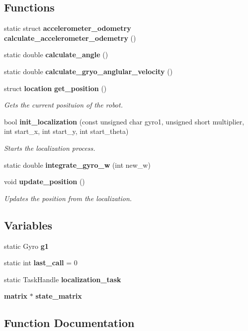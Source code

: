 \subsection*{Functions}
\begin{DoxyCompactItemize}
\item 
static struct \textbf{ accelerometer\+\_\+odometry} \textbf{ calculate\+\_\+accelerometer\+\_\+odemetry} ()
\item 
static double \textbf{ calculate\+\_\+angle} ()
\item 
static double \textbf{ calculate\+\_\+gryo\+\_\+anglular\+\_\+velocity} ()
\item 
struct \textbf{ location} \textbf{ get\+\_\+position} ()
\begin{DoxyCompactList}\small\item\em Gets the current posituion of the robot. \end{DoxyCompactList}\item 
bool \textbf{ init\+\_\+localization} (const unsigned char gyro1, unsigned short multiplier, int start\+\_\+x, int start\+\_\+y, int start\+\_\+theta)
\begin{DoxyCompactList}\small\item\em Starts the localization process. \end{DoxyCompactList}\item 
static double \textbf{ integrate\+\_\+gyro\+\_\+w} (int new\+\_\+w)
\item 
void \textbf{ update\+\_\+position} ()
\begin{DoxyCompactList}\small\item\em Updates the position from the localization. \end{DoxyCompactList}\end{DoxyCompactItemize}
\subsection*{Variables}
\begin{DoxyCompactItemize}
\item 
static Gyro \textbf{ g1}
\item 
static int \textbf{ last\+\_\+call} = 0
\item 
static Task\+Handle \textbf{ localization\+\_\+task}
\item 
\textbf{ matrix} $\ast$ \textbf{ state\+\_\+matrix}
\end{DoxyCompactItemize}


\subsection{Function Documentation}
\mbox{\label{localization_8c_a6785e4b3b61887f28028f05019b9b39d}} 
